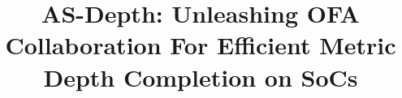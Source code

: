 \documentclass[conference]{support/IEEEtran}
\begin{document}
\title{AS-Depth: Unleashing OFA Collaboration For Efficient Metric Depth Completion on SoCs}

\author{
}

\maketitle

\end{document}
